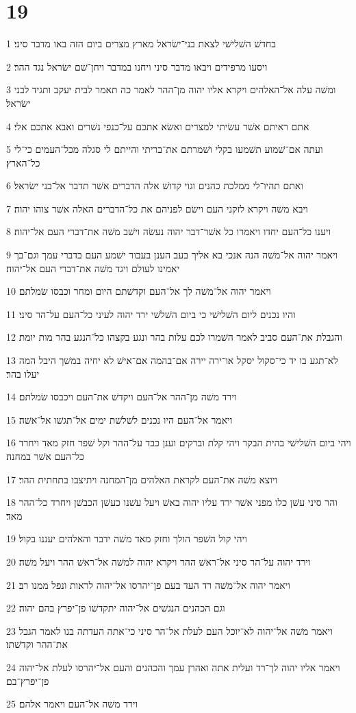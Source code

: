 \chapter{19}

\par 1 בחדשׁ השׁלישׁי לצאת בני־ישׂראל מארץ מצרים ביום הזה באו מדבר סיני׃
\par 2 ויסעו מרפידים ויבאו מדבר סיני ויחנו במדבר ויחן־שׁם ישׂראל נגד ההר׃
\par 3 ומשׁה עלה אל־האלהים ויקרא אליו יהוה מן־ההר לאמר כה תאמר לבית יעקב ותגיד לבני ישׂראל׃
\par 4 אתם ראיתם אשׁר עשׂיתי למצרים ואשׂא אתכם על־כנפי נשׁרים ואבא אתכם אלי׃
\par 5 ועתה אם־שׁמוע תשׁמעו בקלי ושׁמרתם את־בריתי והייתם לי סגלה מכל־העמים כי־לי כל־הארץ׃
\par 6 ואתם תהיו־לי ממלכת כהנים וגוי קדושׁ אלה הדברים אשׁר תדבר אל־בני ישׂראל׃
\par 7 ויבא משׁה ויקרא לזקני העם וישׂם לפניהם את כל־הדברים האלה אשׁר צוהו יהוה׃
\par 8 ויענו כל־העם יחדו ויאמרו כל אשׁר־דבר יהוה נעשׂה וישׁב משׁה את־דברי העם אל־יהוה׃
\par 9 ויאמר יהוה אל־משׁה הנה אנכי בא אליך בעב הענן בעבור ישׁמע העם בדברי עמך וגם־בך יאמינו לעולם ויגד משׁה את־דברי העם אל־יהוה׃
\par 10 ויאמר יהוה אל־משׁה לך אל־העם וקדשׁתם היום ומחר וכבסו שׂמלתם׃
\par 11 והיו נכנים ליום השׁלישׁי כי ביום השׁלשׁי ירד יהוה לעיני כל־העם על־הר סיני׃
\par 12 והגבלת את־העם סביב לאמר השׁמרו לכם עלות בהר ונגע בקצהו כל־הנגע בהר מות יומת׃
\par 13 לא־תגע בו יד כי־סקול יסקל או־ירה יירה אם־בהמה אם־אישׁ לא יחיה במשׁך היבל המה יעלו בהר׃
\par 14 וירד משׁה מן־ההר אל־העם ויקדשׁ את־העם ויכבסו שׂמלתם׃
\par 15 ויאמר אל־העם היו נכנים לשׁלשׁת ימים אל־תגשׁו אל־אשׁה׃
\par 16 ויהי ביום השׁלישׁי בהית הבקר ויהי קלת וברקים וענן כבד על־ההר וקל שׁפר חזק מאד ויחרד כל־העם אשׁר במחנה׃
\par 17 ויוצא משׁה את־העם לקראת האלהים מן־המחנה ויתיצבו בתחתית ההר׃
\par 18 והר סיני עשׁן כלו מפני אשׁר ירד עליו יהוה באשׁ ויעל עשׁנו כעשׁן הכבשׁן ויחרד כל־ההר מאד׃
\par 19 ויהי קול השׁפר הולך וחזק מאד משׁה ידבר והאלהים יעננו בקול׃
\par 20 וירד יהוה על־הר סיני אל־ראשׁ ההר ויקרא יהוה למשׁה אל־ראשׁ ההר ויעל משׁה׃
\par 21 ויאמר יהוה אל־משׁה רד העד בעם פן־יהרסו אל־יהוה לראות ונפל ממנו רב׃
\par 22 וגם הכהנים הנגשׁים אל־יהוה יתקדשׁו פן־יפרץ בהם יהוה׃
\par 23 ויאמר משׁה אל־יהוה לא־יוכל העם לעלת אל־הר סיני כי־אתה העדתה בנו לאמר הגבל את־ההר וקדשׁתו׃
\par 24 ויאמר אליו יהוה לך־רד ועלית אתה ואהרן עמך והכהנים והעם אל־יהרסו לעלת אל־יהוה פן־יפרץ־בם׃
\par 25 וירד משׁה אל־העם ויאמר אלהם׃

